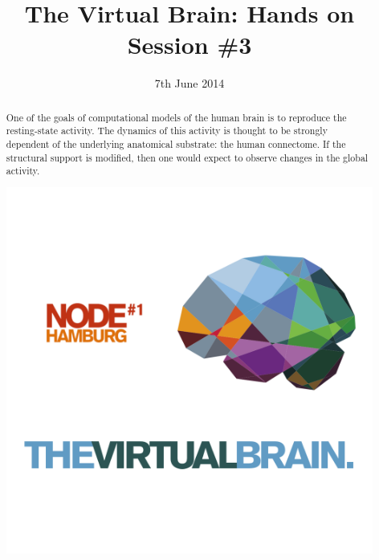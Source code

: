 \documentclass{tufte-handout}
\title{The Virtual Brain: Hands on Session \#3}
\date{7th June 2014}
\begin{document}
\maketitle %

\begin{abstract}
\noindent One of the goals of computational models of the human brain is to
reproduce the resting-state activity. The dynamics of this activity is thought
to be strongly dependent of the underlying anatomical substrate: the human
connectome. If the structural support is modified, then one would expect to
observe changes in the global activity.

\begin{marginfigure}%
  \includegraphics[width=\linewidth]{tvb_logo_transparent_square}
  \label{fig:marginfig}
\end{marginfigure}
\end{abstract}


\end{document}
